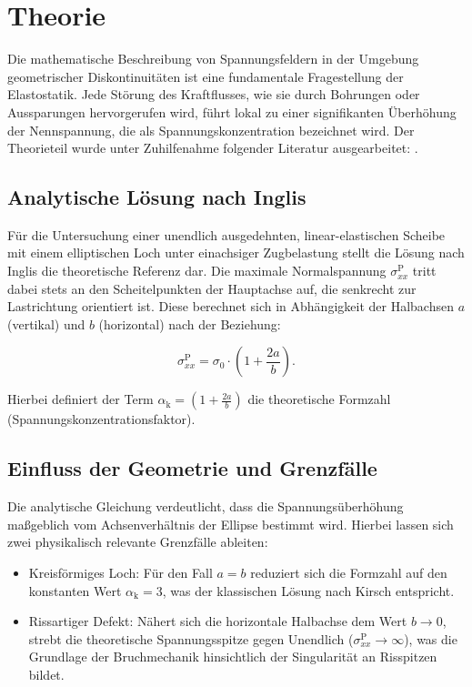 \chapter{Theorie}
\label{sec:Theorie}

Die mathematische Beschreibung von Spannungsfeldern in der Umgebung geometrischer Diskontinuitäten ist eine fundamentale Fragestellung der Elastostatik. Jede Störung des Kraftflusses, wie sie durch Bohrungen oder Aussparungen hervorgerufen wird, führt lokal zu einer signifikanten Überhöhung der Nennspannung, die als Spannungskonzentration bezeichnet wird. Der Theorieteil wurde unter Zuhilfenahme folgender Literatur ausgearbeitet: \cite{Niemann19} \cite{Sedlacek09} \cite{roesler12}.


\section{Analytische Lösung nach Inglis}
\label{sec:Analytische Lösung nach Inglis}

Für die Untersuchung einer unendlich ausgedehnten, linear-elastischen Scheibe mit einem elliptischen Loch unter einachsiger Zugbelastung stellt die Lösung nach Inglis die theoretische Referenz dar. Die maximale Normalspannung ${\sigma_{xx}^{\mathrm{P}}}$ tritt dabei stets an den Scheitelpunkten der Hauptachse auf, die senkrecht zur Lastrichtung orientiert ist. Diese berechnet sich in Abhängigkeit der Halbachsen ${a}$ (vertikal) und ${b}$ (horizontal) nach der Beziehung:

\begin{equation}
    \sigma_{xx}^{\mathrm{P}} = \sigma_{0} \cdot \left( 1 + \frac{2a}{b} \right).
    \label{eq:Inglis Lösung}
\end{equation}

Hierbei definiert der Term ${\alpha_{\mathrm{k}} = \left( 1 + \frac{2a}{b} \right)}$ die theoretische Formzahl (Spannungskonzentrationsfaktor).

\section{Einfluss der Geometrie und Grenzfälle}
\label{sec:Einfluss der Geometrie und Grenzfälle}

Die analytische Gleichung verdeutlicht, dass die Spannungsüberhöhung maßgeblich vom Achsenverhältnis der Ellipse bestimmt wird. Hierbei lassen sich zwei physikalisch relevante Grenzfälle ableiten:

\begin{itemize}
    \item Kreisförmiges Loch: Für den Fall ${a = b}$ reduziert sich die Formzahl auf den konstanten Wert ${\alpha_{\mathrm{k}} = 3}$, was der klassischen Lösung nach Kirsch entspricht.
    \item Rissartiger Defekt: Nähert sich die horizontale Halbachse dem Wert ${b \rightarrow 0}$, strebt die theoretische Spannungsspitze gegen Unendlich (${\sigma_{xx}^{\mathrm{P}} \rightarrow \infty}$), was die Grundlage der Bruchmechanik hinsichtlich der Singularität an Risspitzen bildet.
\end{itemize}

